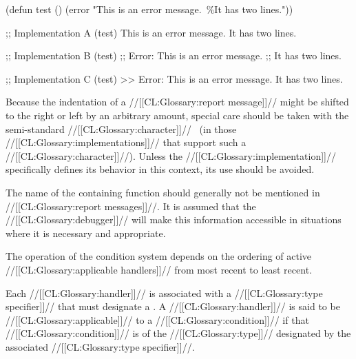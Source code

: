 \code
 (defun test ()
   (error "This is an error message.~\%It has two lines."))

 ;; Implementation A
 (test)
 This is an error message.
 It has two lines.

 ;; Implementation B
 (test)
 ;; Error: This is an error message.
 ;;        It has two lines.

 ;; Implementation C
 (test)
 >> Error: This is an error message. 
           It has two lines. \endcode

\endsubsubsubsection%


Because the indentation of a //[[CL:Glossary:report message]]// might be shifted to the right or left by an arbitrary amount, special care should be taken with the semi-standard //[[CL:Glossary:character]]// \TabChar\  (in those //[[CL:Glossary:implementations]]// that support such a //[[CL:Glossary:character]]//).   Unless the //[[CL:Glossary:implementation]]// specifically defines its behavior  in this context, its use should be avoided.

\endsubsubsubsection%


The name of the containing function should generally not be mentioned in //[[CL:Glossary:report messages]]//.  It is assumed that the //[[CL:Glossary:debugger]]// will make this information accessible in situations where it is necessary and appropriate.

\endsubsubsubsection%

\endsubsubsection%

\endsubsection%
  The operation of the condition system depends on the ordering of active //[[CL:Glossary:applicable handlers]]// from most recent to least recent.

Each //[[CL:Glossary:handler]]// is associated with a //[[CL:Glossary:type specifier]]// that must designate a .  A //[[CL:Glossary:handler]]// is said to be //[[CL:Glossary:applicable]]// to a //[[CL:Glossary:condition]]// if that //[[CL:Glossary:condition]]// is of the //[[CL:Glossary:type]]// designated by the associated //[[CL:Glossary:type specifier]]//.

